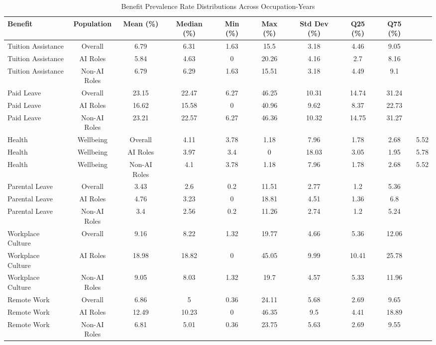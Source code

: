 \begin{table}[htbp]
\caption{Benefit Prevalence Rate Distributions Across Occupation-Years}
\label{tab:prevalence_distributions}
\begin{tabular}{lcccccccc}
\hline\hline
Benefit & Population & Mean (\%) & Median (\%) & Min (\%) & Max (\%) & Std Dev (\%) & Q25 (\%) & Q75 (\%) \\
\hline
Tuition Assistance & Overall & 6.79 & 6.31 & 1.63 & 15.5 & 3.18 & 4.46 & 9.05 \\
Tuition Assistance & AI Roles & 5.84 & 4.63 & 0 & 20.26 & 4.16 & 2.7 & 8.16 \\
Tuition Assistance & Non-AI Roles & 6.79 & 6.29 & 1.63 & 15.51 & 3.18 & 4.49 & 9.1 \\
Paid Leave & Overall & 23.15 & 22.47 & 6.27 & 46.25 & 10.31 & 14.74 & 31.24 \\
Paid Leave & AI Roles & 16.62 & 15.58 & 0 & 40.96 & 9.62 & 8.37 & 22.73 \\
Paid Leave & Non-AI Roles & 23.21 & 22.57 & 6.27 & 46.36 & 10.32 & 14.75 & 31.27 \\
Health & Wellbeing & Overall & 4.11 & 3.78 & 1.18 & 7.96 & 1.78 & 2.68 & 5.52 \\
Health & Wellbeing & AI Roles & 3.97 & 3.4 & 0 & 18.03 & 3.05 & 1.95 & 5.78 \\
Health & Wellbeing & Non-AI Roles & 4.1 & 3.78 & 1.18 & 7.96 & 1.78 & 2.68 & 5.52 \\
Parental Leave & Overall & 3.43 & 2.6 & 0.2 & 11.51 & 2.77 & 1.2 & 5.36 \\
Parental Leave & AI Roles & 4.76 & 3.23 & 0 & 18.81 & 4.51 & 1.36 & 6.8 \\
Parental Leave & Non-AI Roles & 3.4 & 2.56 & 0.2 & 11.26 & 2.74 & 1.2 & 5.24 \\
Workplace Culture & Overall & 9.16 & 8.22 & 1.32 & 19.77 & 4.66 & 5.36 & 12.06 \\
Workplace Culture & AI Roles & 18.98 & 18.82 & 0 & 45.05 & 9.99 & 10.41 & 25.78 \\
Workplace Culture & Non-AI Roles & 9.05 & 8.03 & 1.32 & 19.7 & 4.57 & 5.33 & 11.96 \\
Remote Work & Overall & 6.86 & 5 & 0.36 & 24.11 & 5.68 & 2.69 & 9.65 \\
Remote Work & AI Roles & 12.49 & 10.23 & 0 & 46.35 & 9.5 & 4.41 & 18.89 \\
Remote Work & Non-AI Roles & 6.81 & 5.01 & 0.36 & 23.75 & 5.63 & 2.69 & 9.55 \\
\hline\hline
\end{tabular}
\end{table}
